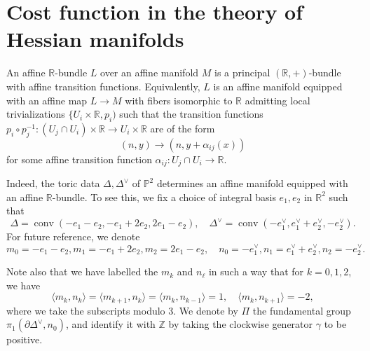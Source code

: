 \documentclass{article}
\newcommand{\RR}{\mathbb{R}}
\newcommand{\ZZ}{\mathbb{Z}}
\newcommand{\op}[1]{\operatorname{#1}}
\begin{document}
\section{Cost function in the theory of Hessian manifolds}\label{sec:CostFunction}
An affine $\mathbb R$-bundle $L$ over an affine manifold $M$ is a principal $(\mathbb R,+)$-bundle with affine transition functions. Equivalently, $L$ is an affine manifold equipped with an affine map $L\rightarrow M$ with fibers isomorphic to $\mathbb R$ admitting local trivializations $\{U_i\times \mathbb R,p_i)$ such that the transition functions $p_i\circ p_j^{-1}:(U_j\cap U_i)\times \mathbb R\rightarrow U_i\times \mathbb R$ are of the form 
$$ (n,y)\rightarrow (n,y+\alpha_{ij}(x)) $$
for some affine transition function $\alpha_{ij}:U_j\cap U_i\rightarrow \mathbb R$.

Indeed, the toric data $\Delta, \Delta^\vee$ of $\mathbb P^2$ determines an affine manifold equipped with an affine $\mathbb R$-bundle. To see this, we fix a choice of integral basis $e_1, e_2$ in $\RR^2$ such that 
\[\Delta = \op{conv}(-e_1-e_2, -e_1+2e_2,2e_1-e_2),\quad \Delta^\vee = \op{conv}(-e_1^\vee, e_1^\vee + e_2^\vee,-e_2^\vee). \]
For future reference, we denote
\[
m_0 = -e_1-e_2, m_1 = -e_1+2e_2, m_2 = 2e_1-e_2, \quad n_0 = -e_1^\vee, n_1 = e_1^\vee + e_2^\vee, n_2=-e_2^\vee.
\]

\begin{center}
\end{center}
Note also that we have labelled the $m_k$ and $n_\ell$ in such a way that for $k=0,1,2$, 
we have 
\[
\langle m_k,n_k \rangle = \langle m_{k+1}, n_k \rangle = \langle m_k, n_{k-1}\rangle = 1, \quad \langle m_k, n_{k+1} \rangle = -2,
\]
where we take the subscripts modulo 3. We denote by $\Pi$ the fundamental group $\pi_1(\partial \Delta^\vee,n_0)$, and identify it with $\ZZ$ by taking the clockwise generator $\gamma$ to be positive.
\end{document}
